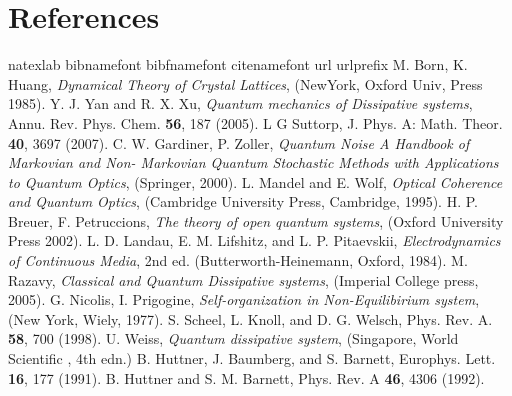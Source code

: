 \documentclass[preprint,showpacs,showkeys,groupedaddress,superscriptaddress]{revtex4}
\begin{document}
\section*{References}
\begin{thebibliography}{10}
\expandafter\ifx\csname natexlab\endcsname\relax\def\natexlab#1{#1}\fi
\expandafter\ifx\csname bibnamefont\endcsname\relax
 \def\bibnamefont#1{#1}\fi
\expandafter\ifx\csname bibfnamefont\endcsname\relax
  \def\bibfnamefont#1{#1}\fi
\expandafter\ifx\csname citenamefont\endcsname\relax
  \def\citenamefont#1{#1}\fi
\expandafter\ifx\csname url\endcsname\relax
  \def\url#1{\texttt{#1}}\fi
\expandafter\ifx\csname urlprefix\endcsname\relax\def\urlprefix{URL }\fi
 M. Born, K. Huang, \emph{Dynamical Theory of Crystal Lattices}, (NewYork, Oxford Univ,
Press 1985).
 Y. J. Yan and R. X. Xu, \emph{Quantum mechanics of Dissipative systems}, Annu. Rev. Phys. Chem. \textbf{56}, 187 (2005).
 L G Suttorp, J. Phys. A: Math. Theor. \textbf{40}, 3697 (2007).
 C. W. Gardiner, P. Zoller, \emph{Quantum Noise A Handbook of Markovian and Non-
Markovian Quantum Stochastic Methods with Applications to Quantum Optics}, (Springer, 2000).
 L. Mandel and E. Wolf, \emph{Optical Coherence and Quantum Optics}, (Cambridge University Press, Cambridge, 1995).
 H. P. Breuer, F. Petruccions, \emph{The theory of open quantum systems}, (Oxford University Press 2002).
 L. D. Landau, E. M. Lifshitz, and L. P. Pitaevskii, \emph{Electrodynamics of Continuous Media}, 2nd ed. (Butterworth-Heinemann, Oxford, 1984).
 M. Razavy, \emph{Classical and Quantum Dissipative systems}, (Imperial College press, 2005).
 G. Nicolis, I. Prigogine, \emph{Self-organization in Non-Equilibirium system}, (New York, Wiely, 1977).
 S. Scheel, L. Knoll, and D. G. Welsch, Phys. Rev. A. \textbf{58}, 700 (1998).
 U. Weiss, \emph{Quantum dissipative system}, (Singapore, World Scientific , 4th edn.)
 B. Huttner, J. Baumberg, and S. Barnett, Europhys. Lett. \textbf{16}, 177 (1991).
 B. Huttner and S. M. Barnett, Phys. Rev. A \textbf{46}, 4306 (1992).

\end{thebibliography}
\end{document}
